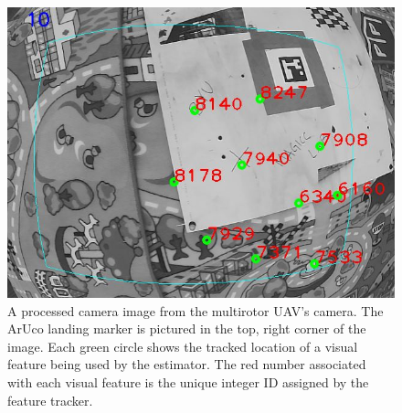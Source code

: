 \begin{figure}
  \centering
  \includegraphics[scale=0.5]{imgs/features_with_aruco.png}
  \caption{A processed camera image from the multirotor UAV's camera. The ArUco
  landing marker is pictured in the top, right corner of the image. Each green
circle shows the tracked location of a visual feature being used by the
estimator. The red number associated with each visual feature is the unique
integer ID assigned by the feature tracker.}
  \label{fig:features_with_aruco}
\end{figure}
